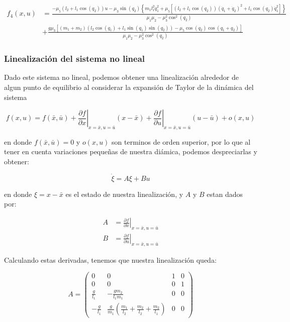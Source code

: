 \documentclass{article}
\begin{document}
\[
\begin{align}
f_4(x, u) &= \frac{-\mu_5 \left( l_2 + l_1 \cos{(q_2)} \right)u - \mu_3 \sin{(q_2)} \left\{ m_1 l_1^2 \dot{q}_1^2 + \mu_5 \left[ \left( l_2 + l_1 \cos{(q_2)} \right) \left( \dot{q}_1 + \dot{q}_2 \right)^2 + l_1 \cos{(q_2)} \dot{q}_1^2 \right] \right\}}{\mu_1 \mu_2 - \mu_3^2 \cos^2{(q_2)}} \\
&+ \frac{g \mu_3 \left[ \left( m_1 + m_2 \right)\left( l_2 \cos{(q_1)} + l_1 \sin{(q_1)} \sin{(q_2)} \right) - \mu_5 \cos{(q_2)} \cos{(q_1 + q_2)} \right]}{\mu_1 \mu_2 - \mu_3^2 \cos^2{(q_2)}}
\end{align}
\]

    \subsubsection*{Linealización del sistema no
lineal}\label{linealizaciuxf3n-del-sistema-no-lineal}

    Dado este sistema no lineal, podemos obtener una linealización alrededor
de algun punto de equilibrio al considerar la expansión de Taylor de la
dinámica del sistema

\[
f(x, u) = f(\bar{x}, \bar{u}) + \left. \frac{\partial f}{\partial x} \right|_{x=\bar{x}, u=\bar{u}} (x - \bar{x}) + \left. \frac{\partial f}{\partial u} \right|_{x=\bar{x}, u=\bar{u}} (u - \bar{u}) + o(x, u)
\]

en donde \(f(\bar{x}, \bar{u}) = 0\) y \(o(x, u)\) son terminos de orden
superior, por lo que al tener en cuenta variaciones pequeñas de nuestra
diámica, podemos despreciarlas y obtener:

\[
\dot{\xi} = A \xi + B u
\]

en donde \(\xi = x - \bar{x}\) es el estado de nuestra linealización, y
\(A\) y \(B\) estan dados por:

\[
\begin{align}
A &= \left. \frac{\partial f}{\partial x} \right|_{x=\bar{x}, u=\bar{u}} \\
B &= \left. \frac{\partial f}{\partial u} \right|_{x=\bar{x}, u=\bar{u}}
\end{align}
\]

Calculando estas derivadas, tenemos que nuestra linealización queda:

\[
A =
\begin{pmatrix}
0 & 0 & 1 & 0 \\
0 & 0 & 0 & 1 \\
\frac{g}{l_1} & -\frac{g m_2}{l_1 m_1} & 0 & 0 \\
-\frac{g}{l_1} & \frac{g}{m_1} \left( \frac{m_1}{l_2} + \frac{m_2}{l_2} + \frac{m_2}{l_1} \right) & 0 & 0
\end{pmatrix}
\]
\end{document}
